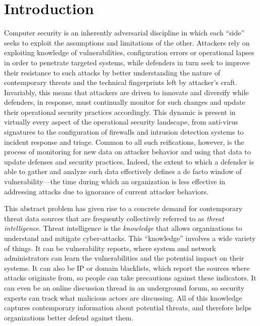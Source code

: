 \chapter{Introduction}
\label{chapter:introduction}

Computer security is an inherently adversarial discipline in which
each ``side'' seeks to exploit the assumptions and limitations of the
other.  Attackers rely on exploiting knowledge of vulnerabilities,
configuration errors or operational lapses in order to penetrate
targeted systems, while defenders in turn seek to improve their
resistance to such attacks by better understanding the nature of
contemporary threats and the technical fingerprints left by attacker's
craft.  Invariably, this means that attackers are driven to innovate
and diversify while defenders, in response, must continually monitor
for such changes and update their operational security practices
accordingly.  This dynamic is present in virtually every aspect of the
operational security landscape, from anti-virus signatures to the
configuration of firewalls and intrusion detection systems to incident
response and triage.  Common to all such reifications, however, is the
process of monitoring for new data on attacker behavior and using that
data to update defenses and security practices. Indeed, the extent to
which a defender is able to gather and analyze such data effectively
defines a de facto window of vulnerability---the time during which an
organization is less effective in addressing attacks due to ignorance
of current attacker behaviors.

This abstract problem has given rise to a concrete demand for
contemporary threat data sources that are frequently collectively
referred to as \emph{threat intelligence}. Threat intelligence 
is the \emph{knowledge} that allows organizations to understand and 
mitigate cyber-attacks. This ``knowledge'' involves a wide variety 
of things. It can be vulnerability reports, where system and 
network administrators can learn the vulnerabilities and the potential
impact on their systems. It can also be IP or domain blacklists,
which report the sources where attacks originate from, so people
can take precautions against these indicators. It can even be an 
online discussion thread in an underground forum, so security 
experts can track what malicious actors are discussing. 
All of this knowledge captures contemporary information about potential 
threats, and therefore helps organizations better defend 
against them.


